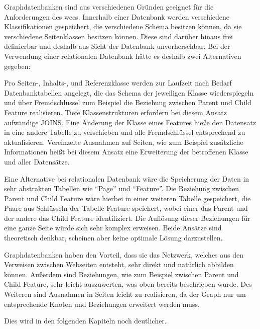     Graphdatenbanken sind aus verschiedenen Gründen geeignet für die Anforderungen des \gls{wccs}.
    Innerhalb einer Datenbank werden verschiedene Klassifikationen gespeichert,
    die verschiedene Schema besitzen können, da sie verschiedene Seitenklassen besitzen können.
    Diese sind darüber hinaus frei definierbar und deshalb aus Sicht der Datenbank unvorhersehbar.
    Bei der Verwendung einer relationalen Datenbank hätte es deshalb zwei Alternativen gegeben:
    
    Pro Seiten-, Inhalts-, und Referenzklasse werden zur Laufzeit nach Bedarf Datenbanktabellen angelegt,
    die das Schema der jeweiligen Klasse wiederspiegeln und über Fremdschlüssel zum Beispiel die Beziehung
    zwischen Parent und Child Feature realisieren.
    Tiefe Klassenstrukturen erfordern bei diesem Ansatz aufwändige JOINS.
    Eine Änderung der Klasse eines Features hieße den Datensatz in eine andere Tabelle zu verschieben
    und alle Fremdschlüssel entsprechend zu aktualisieren.
    Vereinzelte Ausnahmen auf Seiten, wie zum Beispiel zusätzliche Informationen heißt bei diesem Ansatz
    eine Erweiterung der betroffenen Klasse und aller Datensätze.

    Eine Alternative bei relationalen Datenbank wäre die Speicherung der Daten in sehr abstrakten Tabellen
    wie "`Page"' und "`Feature"'.
    Die Beziehung zwischen Parent und Child Feature wäre hierbei in einer weiteren Tabelle gespeichert,
    die Paare aus Schlüsseln der Tabelle Feature speichert, wobei einer das Parent und der andere das
    Child Feature identifiziert.
    Die Auflösung dieser Beziehungen für eine ganze Seite würde sich sehr komplex erweisen.
    Beide Ansätze sind theoretisch denkbar, scheinen aber keine optimale Lösung darzustellen.
    
    Graphdatenbanken haben den Vorteil, dass sie das Netzwerk, welches aus den Verweisen zwischen
    Webseiten entsteht, sehr direkt und natürlich abbilden können.
    Außerdem sind Beziehungen, wie zum Beispiel zwischen Parent und Child Feature,
    sehr leicht auszuwerten, was oben bereits beschrieben wurde.
    Des Weiteren sind Ausnahmen in Seiten leicht zu realisieren,
    da der Graph nur um entsprechende Knoten und Beziehungen erweitert werden muss.

    Dies wird in den folgenden Kapiteln noch deutlicher.